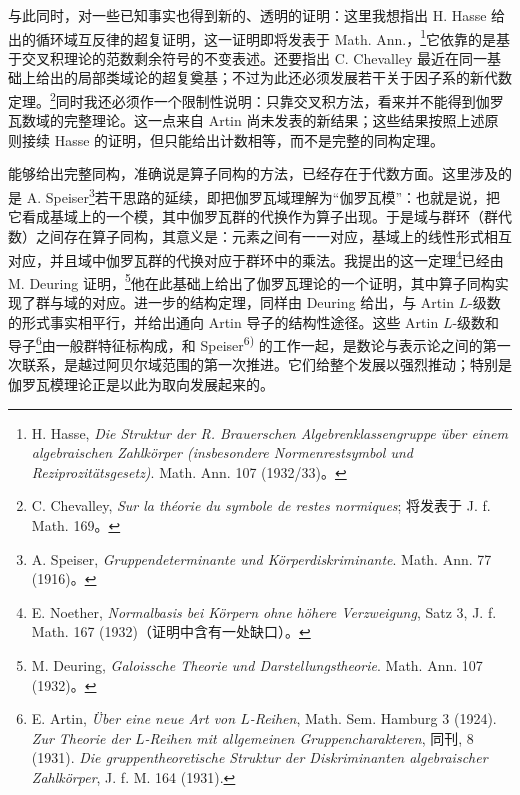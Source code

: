 与此同时，对一些已知事实也得到新的、透明的证明：这里我想指出 H. Hasse 给出的循环域互反律的超复证明，这一证明即将发表于 Math. Ann.，\footnote{H. Hasse, \emph{Die Struktur der R. Brauerschen Algebrenklassengruppe über einem algebraischen Zahlkörper (insbesondere Normenrestsymbol und Reziprozitätsgesetz)}. Math. Ann. 107 (1932/33)。}它依靠的是基于交叉积理论的范数剩余符号的不变表述。还要指出 C. Chevalley 最近在同一基础上给出的局部类域论的超复奠基；不过为此还必须发展若干关于因子系的新代数定理。\footnote{C. Chevalley, \emph{Sur la théorie du symbole de restes normiques}; 将发表于 J. f. Math. 169。}同时我还必须作一个限制性说明：只靠交叉积方法，看来并不能得到伽罗瓦数域的完整理论。这一点来自 Artin 尚未发表的新结果；这些结果按照上述原则接续 Hasse 的证明，但只能给出计数相等，而不是完整的同构定理。

能够给出完整同构，准确说是算子同构的方法，已经存在于代数方面。这里涉及的是 A. Speiser\footnote{A. Speiser, \emph{Gruppendeterminante und Körperdiskriminante}. Math. Ann. 77 (1916)。}若干思路的延续，即把伽罗瓦域理解为“伽罗瓦模”：也就是说，把它看成基域上的一个模，其中伽罗瓦群的代换作为算子出现。于是域与群环（群代数）之间存在算子同构，其意义是：元素之间有一一对应，基域上的线性形式相互对应，并且域中伽罗瓦群的代换对应于群环中的乘法。我提出的这一定理\footnote{E. Noether, \emph{Normalbasis bei Körpern ohne höhere Verzweigung}, Satz 3, J. f. Math. 167 (1932)（证明中含有一处缺口）。}已经由 M. Deuring 证明，\footnote{M. Deuring, \emph{Galoissche Theorie und Darstellungstheorie}. Math. Ann. 107 (1932)。}他在此基础上给出了伽罗瓦理论的一个证明，其中算子同构实现了群与域的对应。进一步的结构定理，同样由 Deuring 给出，与 Artin \(L\)-级数的形式事实相平行，并给出通向 Artin 导子的结构性途径。这些 Artin \(L\)-级数和导子\footnote{E. Artin, \emph{Über eine neue Art von \(L\)-Reihen}, Math. Sem. Hamburg 3 (1924). \emph{Zur Theorie der \(L\)-Reihen mit allgemeinen Gruppencharakteren}, 同刊, 8 (1931). \emph{Die gruppentheoretische Struktur der Diskriminanten algebraischer Zahlkörper}, J. f. M. 164 (1931).}由一般群特征标构成，和 Speiser\textsuperscript{6)} 的工作一起，是数论与表示论之间的第一次联系，是越过阿贝尔域范围的第一次推进。它们给整个发展以强烈推动；特别是伽罗瓦模理论正是以此为取向发展起来的。

